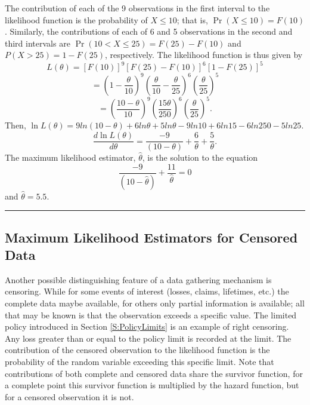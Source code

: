 \documentclass[]{book}
\theoremstyle{definition}
\theoremstyle{definition}
\theoremstyle{definition}
\theoremstyle{remark}
\begin{document}
The contribution of each of the 9 observations in the first interval to
the likelihood function is the probability of \(X \leq 10\); that is,
\(\Pr\left( X \leq 10 \right) = F\left( 10 \right)\). Similarly, the
contributions of each of 6 and 5 observations in the second and third
intervals are
\(\Pr\left( 10 < X \leq 25 \right) = F\left( 25 \right) - F(10)\) and
\(P\left( X > 25 \right) = 1 - F(25)\), respectively. The likelihood
function is thus given by
\[L\left( \theta \right) = \left\lbrack F\left( 10 \right) \right\rbrack^{9}\left\lbrack F\left( 25 \right) - F(10) \right\rbrack^{6}\left\lbrack 1 - F(25) \right\rbrack^{5}\]
\[{= \left( 1 - \frac{\theta}{10} \right)}^{9}\left( \frac{\theta}{10} - \frac{\theta}{25} \right)^{6}\left( \frac{\theta}{25} \right)^{5}\]
\[{= \left( \frac{10 - \theta}{10} \right)}^{9}\left( \frac{15\theta}{250} \right)^{6}\left( \frac{\theta}{25} \right)^{5}.\]
Then,
\(\ln L \left( \theta \right) = 9ln\left( 10 - \theta \right) + 6ln\theta + 5ln\theta - 9ln10 + 6ln15 - 6ln250 - 5ln25\).
\[\frac{d \ln L \left( \theta \right)}{d \theta} = \frac{- 9}{\left( 10 - \theta \right)} + \frac{6}{\theta} + \frac{5}{\theta}.\]
The maximum likelihood estimator, \(\hat{\theta}\), is the solution to
the equation
\[\frac{- 9}{\left( 10 - \hat{\theta} \right)} + \frac{11}{\hat{\theta}} = 0\]
and \(\hat{\theta} = 5.5\).

\begin{center}\rule{0.5\linewidth}{\linethickness}\end{center}

\subsection{Maximum Likelihood Estimators for Censored
Data}\label{maximum-likelihood-estimators-for-censored-data}

Another possible distinguishing feature of a data gathering mechanism is
censoring. While for some events of interest (losses, claims, lifetimes,
etc.) the complete data maybe available, for others only partial
information is available; all that may be known is that the observation
exceeds a specific value. The limited policy introduced in Section
\ref{S:PolicyLimits} is an example of right censoring. Any loss greater
than or equal to the policy limit is recorded at the limit. The
contribution of the censored observation to the likelihood function is
the probability of the random variable exceeding this specific limit.
Note that contributions of both complete and censored data share the
survivor function, for a complete point this survivor function is
multiplied by the hazard function, but for a censored observation it is
not.
\end{document}
